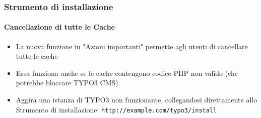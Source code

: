 
\begin{frame}[fragile]
	\frametitle{Strumento di installazione}
	\framesubtitle{Cancellazione di tutte le Cache}

	\begin{itemize}
		\item La nuova funzione in "Azioni importanti" permette agli utenti di cancellare tutte le cache
		\item Essa funziona anche se le cache contengono codice PHP non valido\newline
			(che potrebbe bloccare TYPO3 CMS)
		\item Aggira una istanza di TYPO3 non funzionante, collegandosi direttamente allo Strumento di installazione: \texttt{http://example.com/typo3/install}
	\end{itemize}


\end{frame}
